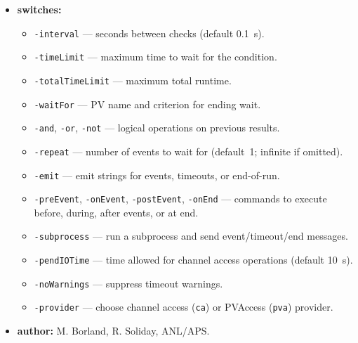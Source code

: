 \begin{itemize}
\item {\bf switches:}
  \begin{itemize}
  \item {\tt -interval} --- seconds between checks (default 0.1~s).
  \item {\tt -timeLimit} --- maximum time to wait for the condition.
  \item {\tt -totalTimeLimit} --- maximum total runtime.
  \item {\tt -waitFor} --- PV name and criterion for ending wait.
  \item {\tt -and}, {\tt -or}, {\tt -not} --- logical operations on previous results.
  \item {\tt -repeat} --- number of events to wait for (default~1; infinite if omitted).
  \item {\tt -emit} --- emit strings for events, timeouts, or end-of-run.
  \item {\tt -preEvent}, {\tt -onEvent}, {\tt -postEvent}, {\tt -onEnd} --- commands to execute before, during, after events, or at end.
  \item {\tt -subprocess} --- run a subprocess and send event/timeout/end messages.
  \item {\tt -pendIOTime} --- time allowed for channel access operations (default 10~s).
  \item {\tt -noWarnings} --- suppress timeout warnings.
  \item {\tt -provider} --- choose channel access ({\tt ca}) or PVAccess ({\tt pva}) provider.
  \end{itemize}
\item {\bf author:} M. Borland, R. Soliday, ANL/APS.
\end{itemize}


